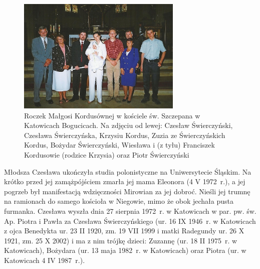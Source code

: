 \begin{figure}[!h]
\begin{center}
\includegraphics[width=0.7\textwidth]{zdjecia/roczek_malgorzaty_kordus.jpg}
\caption[Roczek Małgorzaty Kordus]{Roczek Małgosi Kordusównej w kościele św. Szczepana w Katowicach Bogucicach. Na zdjęciu od lewej: Czesław Świerczyński, Czesława Świerczyńska, Krzysiu Kordus, Zuzia ze Świerczyńskich Kordus, Bożydar Świerczyński, Wiesława i (z tyłu) Franciszek Kordusowie (rodzice Krzysia) oraz Piotr Świerczyński}
\label{rys:roczek_malgorzaty_kordus}
\end{center}
\end{figure}

Młodsza Czesława ukończyła studia polonistyczne na Uniwersytecie Śląskim. Na krótko przed jej zamążpójściem zmarła jej mama Eleonora (4 V 1972~r.), a jej pogrzeb był manifestacją wdzięczności Mirowian za jej dobroć. Nieśli jej trumnę na ramionach do samego kościoła w Niegowie, mimo że obok jechała pusta furmanka. Czesława wyszła dnia 27 sierpnia 1972~r.  w Katowicach w par. pw. św. Ap. Piotra i Pawła za Czesława Świerczyńskiego (ur. 16 IX 1946~r. w Katowicach z ojca Benedykta ur. 23 II 1920, zm. 19 VII 1999 i matki Radegundy ur. 26 X 1921, zm. 25 X 2002) i ma z nim trójkę dzieci: Zuzannę (ur. 18 II 1975~r. w Katowicach), Bożydara (ur. 13 maja 1982~r. w Katowicach) oraz Piotra (ur. w Katowicach 4 IV 1987~r.).

